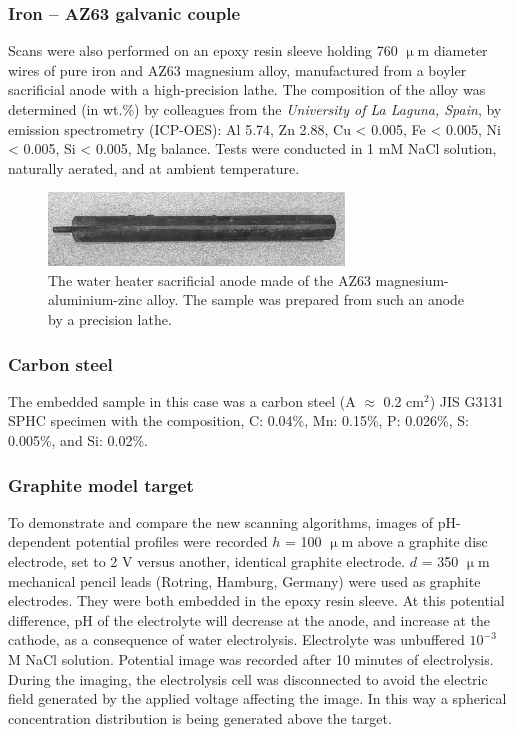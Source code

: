 			\subsubsection{Iron -- AZ63 galvanic couple}
Scans were also performed on an epoxy resin sleeve holding 760 $\upmu$m diameter wires of pure iron and AZ63 magnesium alloy, manufactured from a boyler sacrificial anode with a high-precision lathe.
The composition of the alloy was determined (in wt.\%) by colleagues from the \emph{University of La Laguna, Spain}, by emission spectrometry (ICP-OES): Al 5.74, Zn 2.88, Cu < 0.005, Fe < 0.005, Ni < 0.005, Si < 0.005, Mg balance.
Tests were conducted in 1 mM NaCl solution, naturally aerated, and at ambient temperature.

\begin{figure}
\centering
\includegraphics[width=0.7\textwidth]{img/az63.jpg}
\caption{The water heater sacrificial anode made of the AZ63 magnesium-aluminium-zinc alloy.
The sample was prepared from such an anode by a precision lathe.}
\label{fig:az63}
\end{figure}
			
			\subsubsection{Carbon steel}
The embedded sample in this case was a carbon steel (A $\approx$ 0.2 cm$^2$) JIS G3131 SPHC specimen with the composition, C: 0.04\%, Mn: 0.15\%, P: 0.026\%, S: 0.005\%, and Si: 0.02\%.

			\subsubsection{Graphite model target}
To demonstrate and compare the new scanning algorithms, images of pH-de\-pen\-dent potential profiles were recorded $h$ = 100 $\upmu$m above a graphite disc electrode, set to 2 V versus another, identical graphite electrode.
$d$ = 350 $\upmu$m mechanical pencil leads (Rotring, Hamburg, Germany) were used as graphite electrodes.
They were both embedded in the epoxy resin sleeve.
At this potential difference, pH of the electrolyte will decrease at the anode, and increase at the cathode, as a consequence of water electrolysis.
Electrolyte was unbuffered $10^{-3}$ M NaCl solution.
Potential image was recorded after 10 minutes of electrolysis.
During the imaging, the electrolysis cell was disconnected to avoid the electric field generated by the applied voltage affecting the image.
In this way a spherical concentration distribution is being generated above the target.

